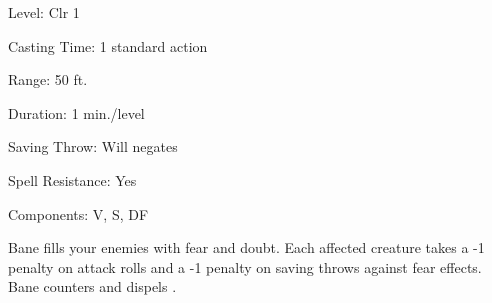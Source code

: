 
\begin{description*}
\item[Level:] Clr 1
\item[Casting Time:] 1 standard action
\item[Range:] 50 ft.
\item[Duration:] 1 min./level
\item[Saving Throw:] Will negates
\item[Spell Resistance:] Yes
\item[Components:] V, S, DF
\end{description*}

Bane fills your enemies with fear and doubt. Each affected creature takes
a -1 penalty on attack rolls and a -1 penalty on saving throws against fear effects.
Bane counters and dispels .